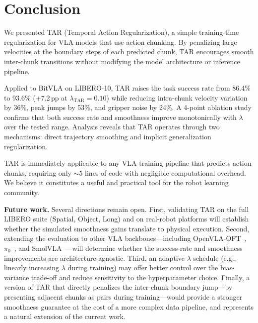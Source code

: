 \section{Conclusion}
\label{sec:conclusion}

We presented TAR (Temporal Action Regularization), a simple training-time regularization for VLA models that use action chunking. By penalizing large velocities at the boundary steps of each predicted chunk, TAR encourages smooth inter-chunk transitions without modifying the model architecture or inference pipeline.

Applied to BitVLA on LIBERO-10, TAR raises the task success rate from 86.4\% to 93.6\% (+7.2\,pp at $\lambda_{\text{TAR}}=0.10$) while reducing intra-chunk velocity variation by 36\%, peak jumps by 53\%, and gripper noise by 24\%. A 4-point ablation study confirms that both success rate and smoothness improve monotonically with $\lambda$ over the tested range. Analysis reveals that TAR operates through two mechanisms: direct trajectory smoothing and implicit generalization regularization.

TAR is immediately applicable to any VLA training pipeline that predicts action chunks, requiring only ${\sim}5$ lines of code with negligible computational overhead. We believe it constitutes a useful and practical tool for the robot learning community.

\textbf{Future work.} Several directions remain open. First, validating TAR on the full LIBERO suite (Spatial, Object, Long) and on real-robot platforms will establish whether the simulated smoothness gains translate to physical execution. Second, extending the evaluation to other VLA backbones---including OpenVLA-OFT~\cite{kim2025openvlaoft}, $\pi_0$~\cite{black2024pi0}, and SmolVLA~\cite{shukor2025smolvla}---will determine whether the success-rate and smoothness improvements are architecture-agnostic. Third, an adaptive $\lambda$ schedule (e.g., linearly increasing $\lambda$ during training) may offer better control over the bias-variance trade-off and reduce sensitivity to the hyperparameter choice. Finally, a version of TAR that directly penalizes the inter-chunk boundary jump---by presenting adjacent chunks as pairs during training---would provide a stronger smoothness guarantee at the cost of a more complex data pipeline, and represents a natural extension of the current work.
